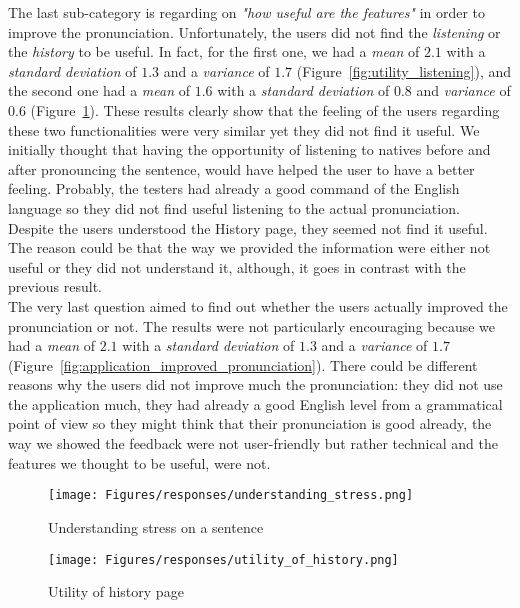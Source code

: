 \noindent The last sub-category is regarding on \textit{"how useful are the features"} in order to improve the pronunciation. Unfortunately, the users did not find the \textit{listening} or the \textit{history} to be useful. In fact, for the first one, we had a \textit{mean} of $2.1$ with a \textit{standard deviation} of $1.3$ and a \textit{variance} of $1.7$ (Figure~\ref{fig:utility_listening}), and the second one had a \textit{mean} of $1.6$ with a \textit{standard deviation} of $0.8$ and \textit{variance} of $0.6$ (Figure~\ref{fig:utility_history}). These results clearly show that the feeling of the users regarding these two functionalities were very similar yet they did not find it useful. We initially thought that having the opportunity of listening to natives before and after pronouncing the sentence, would have helped the user to have a better feeling. Probably, the testers had already a good command of the English language so they did not find useful listening to the actual pronunciation. \\
Despite the users understood the History page, they seemed not find it useful. The reason could be that the way we provided the information were either not useful or they did not understand it, although, it goes in contrast with the previous result. \\
\noindent The very last question aimed to find out whether the users actually improved the pronunciation or not. The results were not particularly encouraging because we had a \textit{mean} of $2.1$ with a \textit{standard deviation} of $1.3$ and a \textit{variance} of $1.7$ (Figure~\ref{fig:application_improved_pronunciation}). There could be different reasons why the users did not improve much the pronunciation: they did not use the application much, they had already a good English level from a grammatical point of view so they might think that their pronunciation is good already, the way we showed the feedback were not user-friendly but rather technical and the features we thought to be useful, were not.

\begin{figure}
	\centering
	\begin{minipage}{.5\textwidth}
		\centering
		\texttt{[image: Figures/responses/understanding\_stress.png]}
		\caption{Understanding stress on a sentence}
		\label{fig:understanding_stress}
	\end{minipage}%
	\begin{minipage}{.5\textwidth}
		\centering
		\texttt{[image: Figures/responses/utility\_of\_history.png]}
		\caption{Utility of history page}
		\label{fig:utility_history}
	\end{minipage}
\end{figure}


